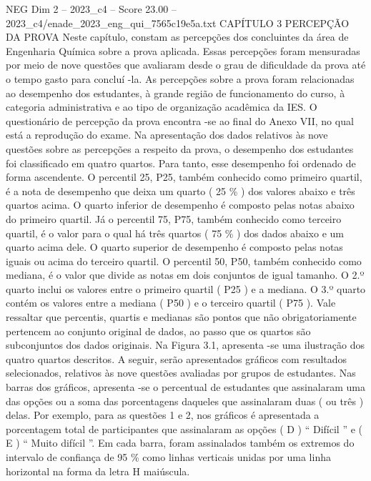 \begin{textsample}{NEG Dim 2 – 2023\_c4 – Score 23.00 – 2023\_c4/enade\_2023\_eng\_qui\_7565c19e5a.txt}  \label{ex:f2_neg_421}
CAPÍTULO 3 PERCEPÇÃO DA PROVA Neste capítulo, constam as percepções dos concluintes da área de Engenharia Química sobre a prova aplicada.
Essas percepções foram mensuradas por meio de nove questões que avaliaram desde o grau de dificuldade da prova até o tempo gasto para concluí -la.
As percepções sobre a prova foram relacionadas ao desempenho dos estudantes, à grande região de funcionamento do curso, à categoria administrativa e ao tipo de organização acadêmica da IES.
O questionário de percepção da prova encontra -se ao final do Anexo VII, no qual está a reprodução do exame.
Na apresentação dos dados relativos às nove questões sobre as percepções a respeito da prova, o desempenho dos estudantes foi classificado em quatro quartos.
Para tanto, esse desempenho foi ordenado de forma ascendente.
O percentil 25, P25, também conhecido como primeiro quartil, é a nota de desempenho que deixa um quarto ( 25 \% ) dos valores abaixo e três quartos acima.
O quarto inferior de desempenho é composto pelas notas abaixo do primeiro quartil.
Já o percentil 75, P75, também conhecido como terceiro quartil, é o valor para o qual há três quartos ( 75 \% ) dos dados abaixo e um quarto acima dele.
O quarto superior de desempenho é composto pelas notas iguais ou acima do terceiro quartil.
O percentil 50, P50, também conhecido como mediana, é o valor que divide as notas em dois conjuntos de igual tamanho.
O 2.º quarto inclui os valores entre o primeiro quartil ( P25 ) e a mediana.
O 3.º quarto contém os valores entre a mediana ( P50 ) e o terceiro quartil ( P75 ).
Vale ressaltar que percentis, quartis e medianas são pontos que não obrigatoriamente pertencem ao conjunto original de dados, ao passo que os quartos são subconjuntos dos dados originais.
Na Figura 3.1, apresenta -se uma ilustração dos quatro quartos descritos.
A seguir, serão apresentados gráficos com resultados selecionados, relativos às nove questões avaliadas por grupos de estudantes.
Nas barras dos gráficos, apresenta -se o percentual de estudantes que assinalaram uma das opções ou a soma das porcentagens daqueles que assinalaram duas ( ou três ) delas.
Por exemplo, para as questões 1 e 2, nos gráficos é apresentada a porcentagem total de participantes que assinalaram as opções ( D ) “ Difícil ” e ( E ) “ Muito difícil ”.
Em cada barra, foram assinalados também os extremos do intervalo de confiança de 95 \% como linhas verticais unidas por uma linha horizontal na forma da letra H maiúscula.

\end{textsample}
